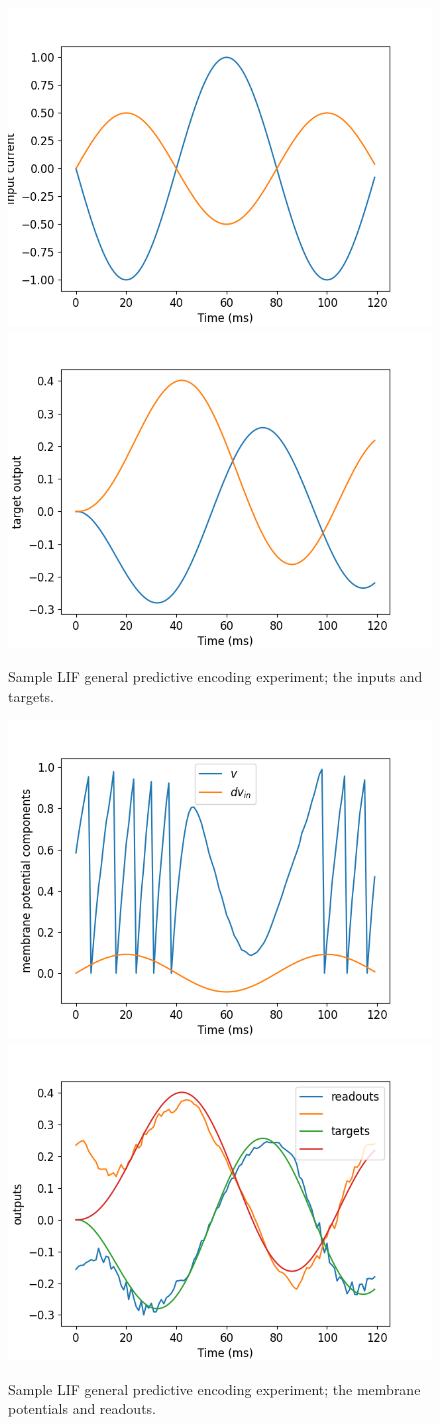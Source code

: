 \documentclass[mphil,deptreport,ianc]{infthesis} %
\begin{document}
\begin{figure}
    \centering
    \includegraphics[width=0.49\columnwidth]{figures/Supplementary/gating/LIF/GeneralPredictiveEncoding/01-04_16-46-28-427/test_plot_inputs_LIF_27.png}
    \includegraphics[width=0.49\columnwidth]{figures/Supplementary/gating/LIF/GeneralPredictiveEncoding/01-04_16-46-28-427/test_plot_itargets_LIF_27.png}
    \caption{Sample LIF general predictive encoding experiment; the inputs and targets.}
    \label{fig:LIF_GPE_1_inputs_targets}
\end{figure}

\begin{figure}
    \centering
    \includegraphics[width=0.49\columnwidth]{figures/Supplementary/gating/LIF/GeneralPredictiveEncoding/01-04_16-46-28-427/test_plot_mem_voltage_single_neuron_LIF_seed__27.png}
    \includegraphics[width=0.49\columnwidth]{figures/Supplementary/gating/LIF/GeneralPredictiveEncoding/01-04_16-46-28-427/test_plot_outputs_LIF_seed_27.png}
    \caption{Sample LIF general predictive encoding experiment; the membrane potentials and readouts.}
    \label{fig:LIF_GPE_1_inputs_targets}
\end{figure}
\end{document}
